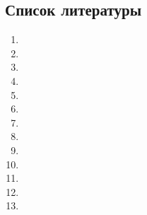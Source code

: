 \documentclass{article}
\begin{document}
    \newpage
    \begin{center} 
    \section{Список литературы}
    \end{center}
    \large
    \begin{enumerate} 
    \item 
    \item 
    \item 
    \item 
    \item 
    \item 
    \item 
    \item 
    \item 
    \item 
    \item 
    \item 
    \item 
    \end{enumerate}
    
\end{document}
